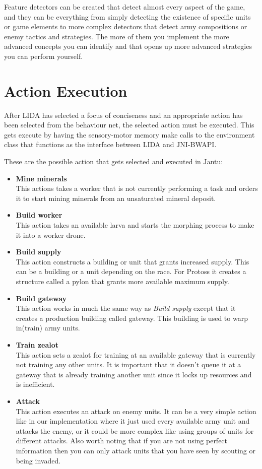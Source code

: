 Feature detectors can be created that detect almost every aspect of the game, and they can be everything from simply detecting the existence of specific units or game elements to more complex detectors that detect army compositions or enemy tactics and strategies. The more of them you implement the more advanced concepts you can identify and that opens up more advanced strategies you can perform yourself. 



\section{Action Execution}
\label{sec:actionexecution}
After LIDA has selected a focus of conciseness and an appropriate action has been selected from the behaviour net, the selected action must be executed. This gets execute by having the sensory-motor memory make calls to the environment class that functions as the interface between LIDA and JNI-BWAPI. 

These are the possible action that gets selected and executed in Jantu:
\begin{itemize}
\item \textbf{Mine minerals} \\
This actions takes a worker that is not currently performing a task and orders it to start mining minerals from an unsaturated mineral deposit.
\item \textbf{Build worker} \\
This action takes an available larva and starts the morphing process to make it into a worker drone. 
\item \textbf{Build supply} \\
This action constructs a building or unit that grants increased supply. This can be a building or a unit depending on the race. For Protoss it creates a structure called a pylon that grants more available maximum supply.  	
\item \textbf{Build gateway} \\
This action works in much the same way as {\em Build supply} except that it creates a production building called gateway. This building is used to warp in(train) army units. 
\item \textbf{Train zealot} \\
This action sets a zealot for training at an available gateway that is currently not training any other units. It is important that it doesn't queue it at a gateway that is already training another unit since it locks up resources and is inefficient. 
\item \textbf{Attack} \\ 
This action executes an attack on enemy units. It can be a very simple action like in our implementation where it just used every available army unit and attacks the enemy, or it could be more complex like using groups of units for different attacks. Also worth noting that if you are not using perfect information then you can only attack units that you have seen by scouting or being invaded. 
\end{itemize}

